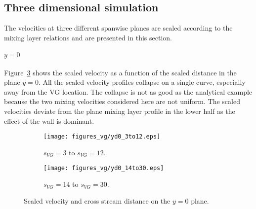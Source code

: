 \subsection{Three dimensional simulation}
The velocities at three different spanwise planes are scaled according to the mixing layer relations and are presented in this section.

\paragraph*{$y = 0$}
Figure~\ref{fig:scaledveld0} shows the scaled velocity as a function of the scaled distance in the plane $y=0$. All the scaled velocity profiles collapse on a single curve, especially away from the VG location. The collapse is not as good as the analytical example because the two mixing velocities considered here are not uniform. The scaled velocities deviate from the plane mixing layer profile in the lower half as the effect of the wall is dominant.
\begin{figure}[h!]
\centering
\captionsetup{justification=centering}
\begin{subfigure}[b]{0.45\textwidth}
  \centering
  \captionsetup{justification=centering}
  \texttt{[image: figures\_vg/yd0\_3to12.eps]}
  \caption{$s_{VG} = 3$ to $s_{VG}=12$.}
  \label{fig:scaleyd01}
\end{subfigure}
\begin{subfigure}[b]{0.45\textwidth}
  \centering
  \captionsetup{justification=centering}  
  \texttt{[image: figures\_vg/yd0\_14to30.eps]}
  \caption{$s_{VG} = 14$ to $s_{VG}=30$.}
  \label{fig:scaleyd02}
\end{subfigure}
\caption{Scaled velocity and cross stream distance on the $y=0$ plane.}
\label{fig:scaledveld0}
\end{figure}

